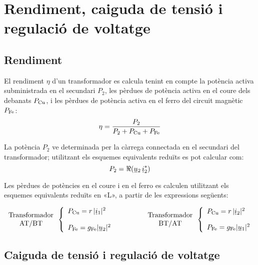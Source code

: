 \section{Rendiment, caiguda de tensió i regulació de voltatge}

\subsection{Rendiment}

El rendiment $\eta$ d'un transformador es calcula tenint en compte la potència activa subministrada en el secundari $P_2$,  les pèrdues de potència activa en el coure dels debanats $P_\mathrm{Cu}$, i les pèrdues de potència activa en el ferro del circuit magnètic $P_\mathrm{Fe}$:
\begin{equation}
    \eta = \frac{P_2}{P_2 + P_\mathrm{Cu} + P_\mathrm{Fe}}
\end{equation}

La potència $P_2$ ve determinada per la càrrega connectada en el secundari del transformador;  utilitzant els esquemes equivalents reduïts es pot calcular com:
\begin{equation}
    P_2 = \Re(\cmplx{u}_2 \,\cmplx{i}_2^*)
\end{equation}

Les pèrdues de potències  en el coure i en el ferro es calculen utilitzant els esquemes equivalents reduïts en «L», a partir de les expressions següents:

\begin{equation}
\begin{array}{c}\text{Transformador}\\
\text{AT/BT}
\end{array} \left\{
\begin{array}{l}
   P\ped{Cu} = r \,|\cmplx{i}_1|^2 \\[2.7ex]
   P\ped{Fe} = g\ped{Fe} |\cmplx{u}_2|^2
\end{array}
\right. \qquad\qquad
\begin{array}{c}\text{Transformador}\\
\text{BT/AT}
\end{array} \left\{
\begin{array}{l}
   P\ped{Cu} = r \,|\cmplx{i}_2|^2 \\[2.5ex]
   P\ped{Fe} = g\ped{Fe} |\cmplx{u}_1|^2
\end{array}
\right.
\end{equation}

\subsection{Caiguda de tensió i regulació de voltatge}

